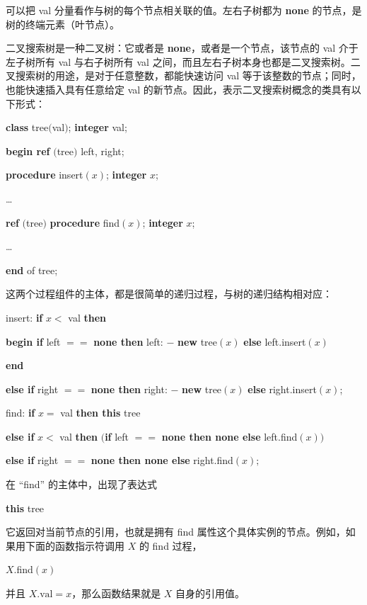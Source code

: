 \noindent
可以把 val 分量看作与树的每个节点相关联的值。左右子树都为 \textbf{none} 的节点，是树的终端元素（叶节点）。

二叉搜索树是一种二叉树：它或者是 \textbf{none}，或者是一个节点，该节点的 val 介于左子树所有 val 与右子树所有 val 之间，而且左右子树本身也都是二叉搜索树。二叉搜索树的用途，是对于任意整数，都能快速访问 val 等于该整数的节点；同时，也能快速插入具有任意给定 val 的新节点。因此，表示二叉搜索树概念的类具有以下形式：

\quad \textbf{class} tree$($val$)$; \textbf{integer} val;

\quad \quad \textbf{begin ref} $($tree$)$ left, right;

\quad \quad \quad \textbf{procedure} insert$(x)$; \textbf{integer} $x$;

\quad \quad \quad \quad \dots

\quad \quad \quad \textbf{ref} $($tree$)$ \textbf{procedure} find$(x)$; \textbf{integer} $x$;

\quad \quad \quad \quad \dots

\quad \quad \textbf{end} of tree;

这两个过程组件的主体，都是很简单的递归过程，与树的递归结构相对应：

\quad insert: \textbf{if} $x <$ val \textbf{then}

\quad \quad \textbf{begin if} left $==$ \textbf{none then} left: $-$ \textbf{new} tree$(x)$ \textbf{else} left.insert$(x)$

\quad \quad \textbf{end}

\quad \textbf{else if} right $==$ \textbf{none then} right: $-$ \textbf{new} tree$(x)$ \textbf{else} right.insert$(x)$;
\smallskip

\quad find: \textbf{if} $x =$ val \textbf{then this} tree

\quad \textbf{else if} $x <$ val \textbf{then} $($\textbf{if} left $==$ \textbf{none then none else} left.find$(x))$

\quad \textbf{else if} right $==$ \textbf{none then none else} right.find$(x);$

\noindent
在 ``find'' 的主体中，出现了表达式

\quad \textbf{this} tree

\noindent
它返回对当前节点的引用，也就是拥有 find 属性这个具体实例的节点。例如，如果用下面的函数指示符调用 $X$ 的 find 过程，

\quad $X.$find$(x)$

\noindent
并且 $X.\text{val} = x$，那么函数结果就是 $X$ 自身的引用值。

